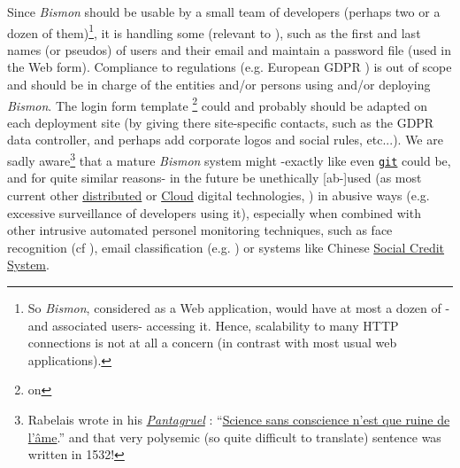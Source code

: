 \begin{itemize}
      Since \textit{Bismon} should be usable by a small team of
      developers (perhaps two or a dozen of them)\footnote{So
        \textit{Bismon}, considered as a Web application, would have
        at most a dozen of  -and associated
        users- accessing it. Hence, scalability to many HTTP
        connections is not at all a concern (in contrast with most
        usual web applications).}, it is handling some  (relevant to ), such as
      the first and last names (or pseudos) of users and their email
      and maintain a password file (used in the Web
       form). Compliance to
       regulations (e.g. European GDPR
      \cite{voigt:2017:eu-gdpr, zuboff:2015:big-other}) is out of
      scope and should be in charge of the entities and/or persons
      using and/or deploying \textit{Bismon}. The login  form template \footnote{on
        }
      could and probably should be adapted on each deployment site (by
      giving there site-specific contacts, such as the GDPR data
      controller, and perhaps add corporate logos and social rules,
      etc...). We are sadly aware\footnote{Rabelais wrote in his
        \href{https://en.wikipedia.org/wiki/Gargantua\_and\_Pantagruel#Pantagruel}{\emph{Pantagruel}}
        :
        ``\href{https://www.linguee.com/french-english/translation/sciences+sans+conscience+n\%27est+que+ruine+de+l\%27\%C3\%A2me.html}{Science
          sans conscience n'est que ruine de l'âme}.''  and that very
        polysemic (so quite difficult to translate) sentence was
        written in 1532!} that a mature \textit{Bismon} system might
      -exactly like even \href{http://git-scm.com}{\texttt{git}}
       could be, and for quite similar
      reasons- in the future be unethically  [ab-]used
      (as most current other
      \href{https://en.wikipedia.org/wiki/Distributed\_computing}{distributed}
      or \href{https://en.wikipedia.org/wiki/Cloud\_computing}{Cloud}
      digital technologies, \cite{thain:2005:distributed-computing,
        dikaiakos:2009:cloud, attiya:2004:distributed,
        peleg:2000:distributed}) in abusive ways (e.g. excessive
       surveillance
      \cite{helbing:2019:big-data-democracy, zuboff:2015:big-other,
        oneil:2016:weapons, huws:2015:icapitalism} of developers using
      it), especially when combined with other intrusive automated
      personel  monitoring techniques, such as face
      recognition  (cf
      \cite{jain:2011:face-recognition}), 
      email classification (e.g. \cite{klimt:2004:enron}) or systems
      like Chinese 
      \href{https://en.wikipedia.org/wiki/Social\_Credit\_System}{Social
        Credit System}.


\end{itemize}
